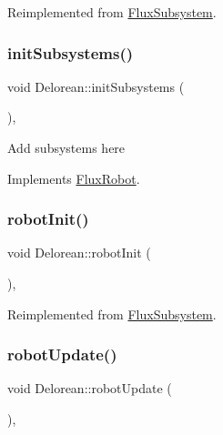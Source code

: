 Reimplemented from \hyperlink{classFluxSubsystem_a5c39cb0f0834cc77a2b8f4f47778da87}{Flux\+Subsystem}.

\mbox{\label{classDelorean_a8ccfc53654ee0512a7e6ba1d6ba739c0}} 
\subsubsection{\texorpdfstring{init\+Subsystems()}{initSubsystems()}}
{\footnotesize\ttfamily void Delorean\+::init\+Subsystems (\begin{DoxyParamCaption}{ }\end{DoxyParamCaption})\hspace{0.3cm}{\ttfamily [override]}, {\ttfamily [virtual]}}

Add subsystems here 

Implements \hyperlink{classFluxRobot_aa5fcf98b4dfd539b1b49772381578dc8}{Flux\+Robot}.

\mbox{\label{classDelorean_a591e1b68a21a82c7e1cf4e7dbf5294a2}} 
\subsubsection{\texorpdfstring{robot\+Init()}{robotInit()}}
{\footnotesize\ttfamily void Delorean\+::robot\+Init (\begin{DoxyParamCaption}{ }\end{DoxyParamCaption})\hspace{0.3cm}{\ttfamily [override]}, {\ttfamily [virtual]}}



Reimplemented from \hyperlink{classFluxSubsystem_aacd5ddfcadda0866d5e838de09a60d63}{Flux\+Subsystem}.

\mbox{\label{classDelorean_a47b9cfdb59a6f46ee26f45f794e313c1}} 
\subsubsection{\texorpdfstring{robot\+Update()}{robotUpdate()}}
{\footnotesize\ttfamily void Delorean\+::robot\+Update (\begin{DoxyParamCaption}{ }\end{DoxyParamCaption})\hspace{0.3cm}{\ttfamily [override]}, {\ttfamily [virtual]}}



